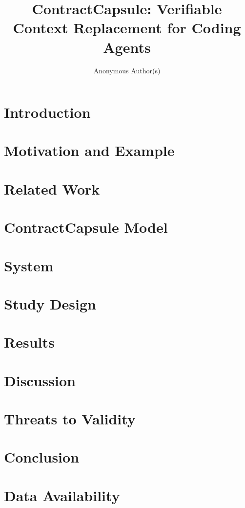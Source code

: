 \documentclass[acmsmall,screen,review,anonymous]{acmart}
\title{ContractCapsule: Verifiable Context Replacement for Coding Agents}
\author{Anonymous Author(s)}
\begin{document}
\begin{abstract}
\end{abstract}

\maketitle

\section{Introduction}

\section{Motivation and Example}

\section{Related Work}

\section{ContractCapsule Model}

\section{System}

\section{Study Design}

\section{Results}

\section{Discussion}

\section{Threats to Validity}

\section{Conclusion}

\section*{Data Availability}
\end{document}
